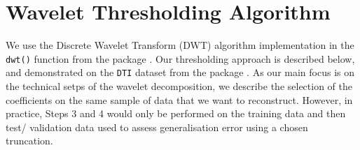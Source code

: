 \section{Wavelet Thresholding Algorithm}

We use the Discrete Wavelet Transform (DWT) algorithm implementation in the \texttt{dwt()} function from the   package \parencite{whitcher_waveslim_2024}.
Our thresholding approach is described below, and demonstrated on the \texttt{DTI} dataset from the   package \parencite{goldsmith_refund_2020}.
As our main focus is on the technical setps of the wavelet decomposition, we describe the selection of the coefficients on the same sample of data that we want to reconstruct. However, in practice, Steps 3 and 4 would only be performed on the training data and then test/ validation data used to assess generalisation error using a chosen truncation.

